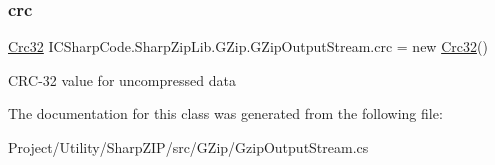 \subsubsection{\texorpdfstring{crc}{crc}}
{\footnotesize\ttfamily \hyperlink{class_i_c_sharp_code_1_1_sharp_zip_lib_1_1_checksums_1_1_crc32}{Crc32} I\+C\+Sharp\+Code.\+Sharp\+Zip\+Lib.\+G\+Zip.\+G\+Zip\+Output\+Stream.\+crc = new \hyperlink{class_i_c_sharp_code_1_1_sharp_zip_lib_1_1_checksums_1_1_crc32}{Crc32}()\hspace{0.3cm}{\ttfamily [protected]}}



C\+R\+C-\/32 value for uncompressed data 



The documentation for this class was generated from the following file\+:\begin{DoxyCompactItemize}
\item 
Project/\+Utility/\+Sharp\+Z\+I\+P/src/\+G\+Zip/Gzip\+Output\+Stream.\+cs\end{DoxyCompactItemize}
